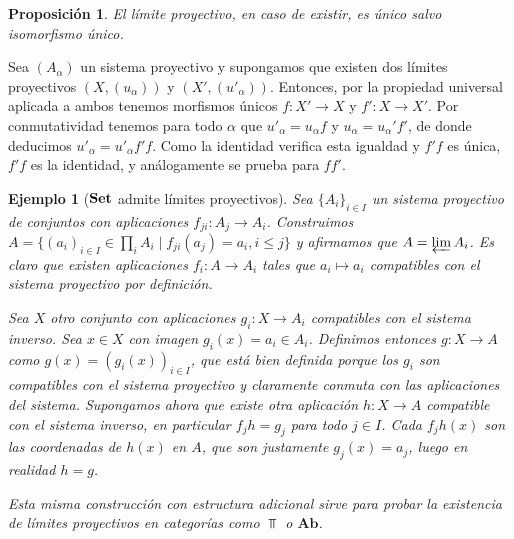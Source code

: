 \documentclass[twoside]{article}
\newtheorem{propo}[defin]{Proposición}
\newtheorem{eje}[defin]{Ejemplo}
\begin{document}
\begin{propo}
El límite proyectivo, en caso de existir, es único salvo isomorfismo único.
\end{propo}
\begin{dem}
Sea $(A_\alpha)$ un sistema proyectivo y supongamos que existen dos límites proyectivos $(X,(u_\alpha))$ y $(X',(u'_\alpha))$. Entonces, por la propiedad universal aplicada a ambos tenemos morfismos únicos $f:X'\to X$ y $f':X\to X'$. Por conmutatividad tenemos para todo $\alpha$ que $u'_\alpha=u_\alpha f$ y $u_\alpha=u_\alpha'f'$, de donde deducimos $u'_\alpha=u'_\alpha f'f$. Como la identidad verifica esta igualdad y $f'f$ es única, $f'f$ es la identidad, y análogamente se prueba para $ff'$. 
\end{dem}


\begin{eje}[$\mathrm{\mathbf{Set}}$ admite límites proyectivos]\label{set}
Sea $\{A_i\}_{i\in I}$ un sistema proyectivo de conjuntos con aplicaciones $f_{ji}:A_j\to A_{i}$. Construimos $A=\{(a_i)_{i\in I}\in \prod_i A_i\mid f_{ji}(a_j)=a_i, i\leq j\}$ y afirmamos que $A=\varprojlim A_i$. Es claro que existen aplicaciones $f_i:A \to A_i$ tales que $a_i\mapsto a_i$ compatibles con el sistema proyectivo por definición.

Sea $X$ otro conjunto con aplicaciones $g_i:X\to A_i$ compatibles con el sistema inverso. Sea $x\in X$ con imagen $g_i(x)=a_i\in A_i$. Definimos entonces $g:X\to A$ como $g(x)=(g_i(x))_{i\in I}$, que está bien definida porque los $g_i$ son compatibles con el sistema proyectivo y claramente conmuta con las aplicaciones del sistema. Supongamos ahora que existe otra aplicación $h:X\to A$ compatible con el sistema inverso, en particular $f_jh=g_j$ para todo $j\in I$. Cada $f_jh(x)$ son las coordenadas de $h(x)$ en $A$, que son justamente $g_j(x)=a_j$, luego en realidad $h=g$. 

Esta misma construcción con estructura adicional sirve para probar la existencia de límites proyectivos en categorías como $\Top$ o $\mathrm{\mathbf{Ab}}$.
\end{eje}
\end{document}
